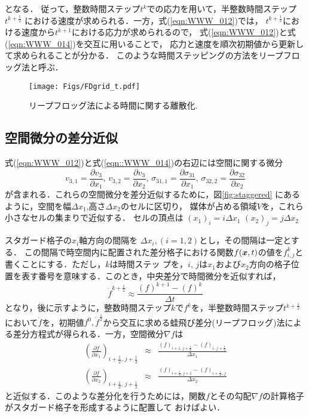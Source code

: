 となる．
従って，整数時間ステップ$t^k$での応力を用いて，半整数時間ステップ$t^{k+\frac{1}{2}}$
における速度が求められる．一方，式(\ref{eqn:WWW_012})では，
$t^{k+\frac{1}{2}}$における速度から$t^{k+1}$における応力が求められるので，
式(\ref{eqn:WWW_012})と式(\ref{eqn:WWW_014})を交互に用いることで，
応力と速度を順次初期値から更新して求められることが分かる．
このような時間ステッピングの方法をリープフロッグ法と呼ぶ．
\begin{figure}[h]
	\begin{center}
	\texttt{[image: Figs/FDgrid\_t.pdf]} 
	\end{center}
	\caption{リープフロッグ法による時間に関する離散化.} 
	\label{fig:leapfrog}
\end{figure}
\subsection{空間微分の差分近似}
式(\ref{eqn:WWW_012})と式(\ref{eqn::WWW_014})の右辺には空間に関する微分
\[
	v_{3,1}=\frac{\partial v_3}{\partial x_1},\,
	v_{3,2}=\frac{\partial v_3}{\partial x_2}, \,
	\sigma_{31,1}=\frac{\partial \sigma_{31}}{\partial x_1},\,
	\sigma_{32,2}=\frac{\partial \sigma_{32}}{\partial x_2}
\]
が含まれる．これらの空間微分を差分近似するために，図\ref{fig:staggered}
にあるように，空間を幅$\Delta x_1$,高さ$\Delta x_2$のセルに区切り，
媒体が占める領域$V$を，これら小さなセルの集まりで近似する．
セルの頂点は
$(x_1)_i=i\Delta x_1$
$(x_2)_j=j\Delta x_2$


スタガード格子の$x_i$軸方向の間隔を
$\Delta x_i,(i=1,2)$とし，その間隔は一定とする．
この間隔で時空間内に配置された差分格子における関数$f(\mbox{\boldmath $x$},t)$の値を$f^k_{i,j}$と書くことにする．ただし，$k$は時間ステッ
プを，$i,\, j$は$x_1$および$x_2$方向の格子位置を表す番号を意味する．このとき，中央差分で時間微分を近似すれば，
\begin{equation}
        \dot{f}^{k+\frac{1}{2}} \approx \frac{ (f)^{k+1}-(f)^k}{\Delta t}
        \label{eqn:dfdt}
\end{equation}
となり，後に示すように，整数時間ステップ$k$で$f^k$を，半整数時間ステップ$t^{k+\frac{1}{2}}$において$\dot f$を，初期値$f^0, \dot f^{\frac{1}{2}}$から交互に求める蛙飛び差分(リープフロッグ)法による差分方程式が得られる．一方，空間微分$\nabla f$は
\begin{eqnarray}
        \left( \frac{\partial f}{\partial x_1}\right)
        _{i+\frac{1}{2}, \, j+\frac{1}{2}}
        & \approx &
                \frac{\left(f\right)_{i+1,j+\frac{1}{2}} -\left(f\right)_{i,\, j+\frac{1}{2}}}
                {\Delta x_1}
        \label{eqn:dfdx1}
        \\
        \left( \frac{\partial f}{\partial x_2}\right)
        _{i+\frac{1}{2}, \, j+\frac{1}{2}}
        & \approx &
        \frac{\left(f\right)_{i+\frac{1}{2},j+1} -\left(f\right)_{i+\frac{1}{2},\, j}}{\Delta x_2}
        \label{eqn:dfdx2}
\end{eqnarray}
と近似する．このような差分化を行うためには，関数$f$とその勾配$\nabla f$の計算格子がスタガード格子を形成するように配置して
おけばよい．


